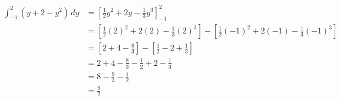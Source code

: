 \documentclass{article}
\begin{document}
\begin{enumerate}
\begin{enumerate}
    \begin{solution}
        \begin{align*}
            \int_{-1}^2 (y+2-y^2)\,dy &= \left[\tfrac{1}{2}y^2+2y-\tfrac{1}{3}y^3\right]_{-1}^2 \\
            &= \left[\tfrac{1}{2}(2)^2+2(2)-\tfrac{1}{3}(2)^3\right] - \left[\tfrac{1}{2}(-1)^2+2(-1)-\tfrac{1}{3}(-1)^3\right] \\
            &= \left[2+4-\tfrac{8}{3}\right] - \left[\tfrac{1}{2}-2+\tfrac{1}{3}\right] \\
            &= 2+4-\tfrac{8}{3}-\tfrac{1}{2}+2-\tfrac{1}{3} \\
            &= 8-\tfrac{9}{3}-\tfrac{1}{2} \\
            &= \boxed{\frac{9}{2}}
        \end{align*}
    \end{solution}
\end{enumerate} 








\end{enumerate}
\end{document}
